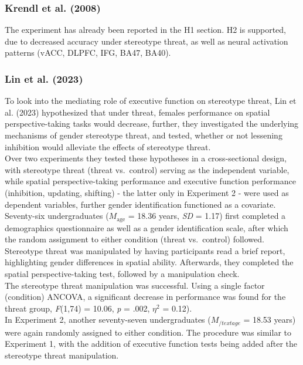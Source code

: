 \documentclass[
  stu,floatsintext]{apa7}
\begin{document}
\subsubsection{Krendl et al. (2008)}\label{krendlnegativeconsequencesthreat2008-1}

The experiment has already been reported in the H1 section.
H2 is supported, due to decreased accuracy under stereotype threat, as well as neural activation patterns (vACC, DLPFC, IFG, BA47, BA40).

\subsubsection{Lin et al. (2023)}\label{lineffectstereotypethreat2023}

To look into the mediating role of executive function on stereotype threat, Lin et al. (2023) hypothesized that under threat, females performance on spatial perspective-taking tasks would decrease, further, they investigated the underlying mechanisms of gender stereotype threat, and tested, whether or not lessening inhibition would alleviate the effects of stereotype threat.\\
Over two experiments they tested these hypotheses in a cross-sectional design, with stereotype threat (threat vs.~control) serving as the independent variable, while spatial perspective-taking performance and executive function performance (inhibition, updating, shifting) - the latter only in Experiment 2 - were used as dependent variables, further gender identification functioned as a covariate.
Seventy-six undergraduates (\(M_{\text{age}}\) = 18.36 years, \emph{SD} = 1.17) first completed a demographics questionnaire as well as a gender identification scale, after which the random assignment to either condition (threat vs.~control) followed.
Stereotype threat was manipulated by having participants read a brief report, highlighting gender differences in spatial ability.
Afterwards, they completed the spatial perspective-taking test, followed by a manipulation check.\\
The stereotype threat manipulation was successful.
Using a single factor (condition) ANCOVA, a significant decrease in performance was found for the threat group, \emph{F}(1,74) = 10.06, \emph{p} = .002, \(\eta^{2}\) = 0.12).\\
In Experiment 2, another seventy-seven undergraduates (\(M_{/text{age}}\) = 18.53 years) were again randomly assigned to either condition.
The procedure was similar to Experiment 1, with the addition of executive function tests being added after the stereotype threat manipulation.
\end{document}
